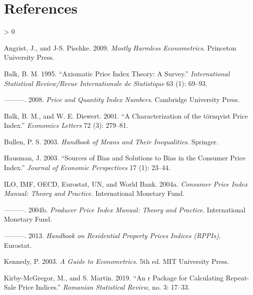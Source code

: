 \documentclass[
]{article}
\newlength{\cslhangindent}
\newenvironment{CSLReferences}[2] %
 {%
  \setlength{\parindent}{0pt}
  \ifodd #1 \everypar{\setlength{\hangindent}{\cslhangindent}}\ignorespaces\fi
  \ifnum #2 > 0
  \setlength{\parskip}{#2\baselineskip}
  \fi
 }%
 {}
\begin{document}
\hypertarget{references}{%
\section*{References}\label{references}}

\hypertarget{refs}{}
\begin{CSLReferences}{1}{0}
\leavevmode\hypertarget{ref-angrist2009}{}%
Angrist, J., and J-S. Pischke. 2009. \emph{Mostly Harmless Econometrics}. Princeton University Press.

\leavevmode\hypertarget{ref-balk1995}{}%
Balk, B. M. 1995. {``Axiomatic Price Index Theory: A Survey.''} \emph{International Statistical Review/Revue Internationale de Statistique} 63 (1): 69--93.

\leavevmode\hypertarget{ref-balk2008}{}%
---------. 2008. \emph{Price and Quantity Index Numbers}. Cambridge University Press.

\leavevmode\hypertarget{ref-balk2001}{}%
Balk, B. M., and W. E. Diewert. 2001. {``A Characterization of the t{ö}rnqvist Price Index.''} \emph{Economics Letters} 72 (3): 279--81.

\leavevmode\hypertarget{ref-bullen2003}{}%
Bullen, P. S. 2003. \emph{Handbook of Means and Their Inequalities}. Springer.

\leavevmode\hypertarget{ref-hausman2003}{}%
Hausman, J. 2003. {``Sources of Bias and Solutions to Bias in the Consumer Price Index.''} \emph{Journal of Economic Perspectives} 17 (1): 23--44.

\leavevmode\hypertarget{ref-cpimanual}{}%
ILO, IMF, OECD, Eurostat, UN, and World Bank. 2004a. \emph{Consumer Price Index Manual: Theory and Practice}. International Monetary Fund.

\leavevmode\hypertarget{ref-ppimanual}{}%
---------. 2004b. \emph{Producer Price Index Manual: Theory and Practice}. International Monetary Fund.

\leavevmode\hypertarget{ref-rppihandbook}{}%
---------. 2013. \emph{Handbook on Residential Property Prices Indices ({RPPIs})}. Eurostat.

\leavevmode\hypertarget{ref-kennedy2003}{}%
Kennedy, P. 2003. \emph{A Guide to Econometrics}. 5th ed. MIT University Press.

\leavevmode\hypertarget{ref-kirbymcgregor2019}{}%
Kirby-McGregor, M., and S. Martin. 2019. {``An r Package for Calculating Repeat-Sale Price Indices.''} \emph{Romanian Statistical Review}, no. 3: 17--33.


\end{CSLReferences}
\end{document}
